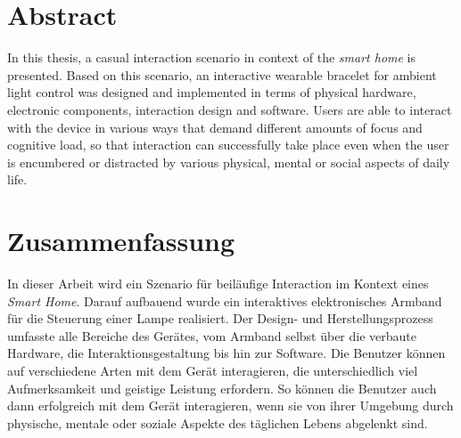 \begingroup
\let\clearpage\relax
\let\cleardoublepage\relax
\let\cleardoublepage\relax

\chapter*{Abstract}
In this thesis, a casual interaction scenario in context of the \textit{smart home} is presented. Based on this scenario, an interactive wearable bracelet for ambient light control was designed and implemented in terms of physical hardware, electronic components, interaction design and software. Users are able to interact with the device in various ways that demand different amounts of focus and cognitive load, so that interaction can successfully take place even when the user is encumbered or distracted by various physical, mental or social aspects of daily life.

\vfill

\chapter*{Zusammenfassung}
In dieser Arbeit wird ein Szenario f\"ur beil\"aufige Interaction im Kontext eines \textit{Smart Home}. Darauf aufbauend wurde ein interaktives elektronisches Armband f\"ur die Steuerung einer Lam\-pe realisiert. Der Design- und Herstellungsprozess umfasste alle Bereiche des Ger\"ates, vom Armband selbst \"uber die verbaute Hardware, die Interaktionsgestaltung bis hin zur Software. Die Benutzer k\"onnen auf verschiedene Arten mit dem Ger\"at interagieren, die unterschiedlich viel Aufmerksamkeit und geistige Leistung erfordern. So k\"onnen die Benutzer auch dann erfolgreich mit dem Ger\"at interagieren, wenn sie von ihrer Umgebung durch physische, mentale oder soziale Aspekte des t\"aglich\-en Lebens abgelenkt sind.


\endgroup			

\vfill